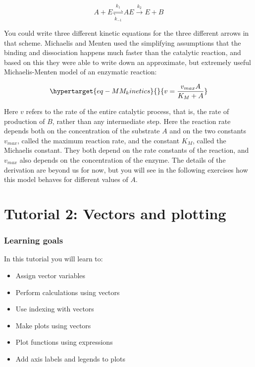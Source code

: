 \documentclass[
  letterpaper,
  DIV=11,
  numbers=noendperiod]{scrreprt}
\providecommand{\tightlist}{%
  \setlength{\itemsep}{0pt}\setlength{\parskip}{0pt}}\usepackage{longtable,booktabs,array}
\begin{document}
\[
A + E \underset{k_{-1}}{\overset{k_1}{\rightleftharpoons}} AE  \xrightarrow{k_2} E + B
\]

You could write three different kinetic equations for the three
different arrows in that scheme. Michaelis and Menten used the
simplifying assumptions that the binding and dissociation happens much
faster than the catalytic reaction, and based on this they were able to
write down an approximate, but extremely useful Michaelis-Menten model
of an enzymatic reaction:

\begin{equation}\protect\hypertarget{eq-MM_kinetics}{}{
v = \frac{v_{max} A}{K_M+A}
}\label{eq-MM_kinetics}\end{equation}

Here \(v\) refers to the rate of the entire catalytic process, that is,
the rate of production of \(B\), rather than any intermediate step. Here
the reaction rate depends both on the concentration of the substrate
\(A\) and on the two constants \(v_{max}\), called the maximum reaction
rate, and the constant \(K_M\), called the Michaelis constant. They both
depend on the rate constants of the reaction, and \(v_{max}\) also
depends on the concentration of the enzyme. The details of the
derivation are beyond us for now, but you will see in the following
exercises how this model behaves for different values of \(A\).


\hypertarget{tutorial-2-vectors-and-plotting}{%
\chapter*{Tutorial 2: Vectors and
plotting}\label{tutorial-2-vectors-and-plotting}}


\hypertarget{learning-goals-1}{%
\subsection*{Learning goals}\label{learning-goals-1}}

In this tutorial you will learn to:

\begin{itemize}
\tightlist
\item
  Assign vector variables
\item
  Perform calculations using vectors
\item
  Use indexing with vectors
\item
  Make plots using vectors
\item
  Plot functions using expressions
\item
  Add axis labels and legends to plots
\end{itemize}
\end{document}
